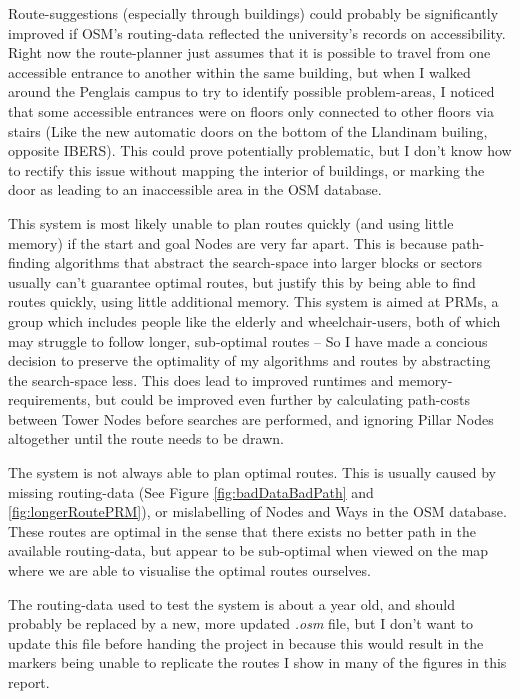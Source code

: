 Route-suggestions (especially through buildings) could probably be significantly improved if OSM's routing-data reflected the university's records on accessibility. Right now the route-planner just assumes that it is possible to travel from one accessible entrance to another within the same building, but when I walked around the Penglais campus to try to identify possible problem-areas, I noticed that some accessible entrances were on floors only connected to other floors via stairs (Like the new automatic doors on the bottom of the Llandinam builing, opposite IBERS). This could prove potentially problematic, but I don't know how to rectify this issue without mapping the interior of buildings, or marking the door as leading to an inaccessible area in the OSM database.

This system is most likely unable to plan routes quickly (and using little memory) if the start and goal Nodes are very far apart. This is because path-finding algorithms that abstract the search-space into larger blocks or sectors usually can't guarantee optimal routes, but justify this by being able to find routes quickly, using little additional memory. This system is aimed at PRMs, a group which includes people like the elderly and wheelchair-users, both of which may struggle to follow longer, sub-optimal routes -- So I have made a concious decision to preserve the optimality of my algorithms and routes by abstracting the search-space less. This does lead to improved runtimes and memory-requirements, but could be improved even further by calculating path-costs between Tower Nodes before searches are performed, and ignoring Pillar Nodes altogether until the route needs to be drawn.

The system is not always able to plan optimal routes. This is usually caused by missing routing-data (See Figure \ref{fig:badDataBadPath} and \ref{fig:longerRoutePRM}), or mislabelling of Nodes and Ways in the OSM database. These routes are optimal in the sense that there exists no better path in the available routing-data, but appear to be sub-optimal when viewed on the map where we are able to visualise the optimal routes ourselves.

The routing-data used to test the system is about a year old, and should probably be replaced by a new, more updated \textit{.osm} file, but I don't want to update this file before handing the project in because this would result in the markers being unable to replicate the routes I show in many of the figures in this report.

